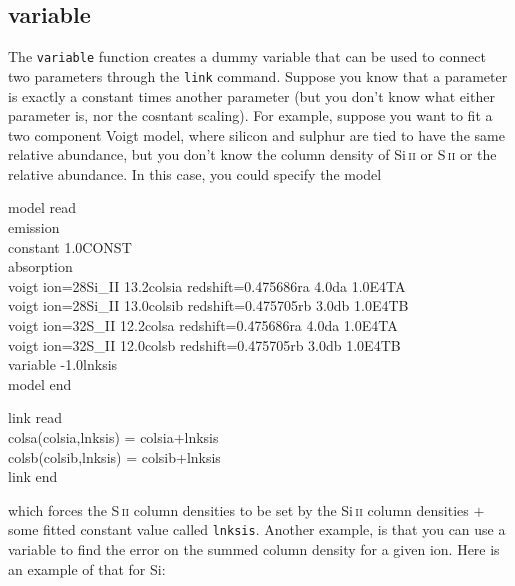 \subsection{variable}

The \texttt{variable} function creates a dummy variable that can be used to connect two parameters through the \texttt{link} command. Suppose you know that a parameter is exactly a constant times another parameter (but you don't know what either parameter is, nor the cosntant scaling). For example, suppose you want to fit a two component Voigt model, where silicon and sulphur are tied to have the same relative abundance, but you don't know the column density of Si\,\textsc{ii} or S\,\textsc{ii} or the relative abundance. In this case, you could specify the model

\vspace{0.3cm}
\begin{mdframed}[style=MyFrame]
model read\\
emission\\
constant 1.0CONST\\
absorption\\
voigt ion=28Si\_II    13.2colsia   redshift=0.475686ra    4.0da   1.0E4TA\\
voigt ion=28Si\_II    13.0colsib   redshift=0.475705rb    3.0db   1.0E4TB\\
voigt ion=32S\_II    12.2colsa   redshift=0.475686ra    4.0da   1.0E4TA\\
voigt ion=32S\_II    12.0colsb   redshift=0.475705rb    3.0db   1.0E4TB\\
variable -1.0lnksis \\
model end\\

\vspace{0.1cm}

\noindent
link read\\
colsa(colsia,lnksis) = colsia+lnksis\\
colsb(colsib,lnksis) = colsib+lnksis\\
link end\\
\end{mdframed}
\vspace{0.2cm}

which forces the S\,\textsc{ii} column densities to be set by the Si\,\textsc{ii} column densities $+$ some fitted constant value called \texttt{lnksis}. Another example, is that you can use a variable to find the error on the summed column density for a given ion. Here is an example of that for Si:

